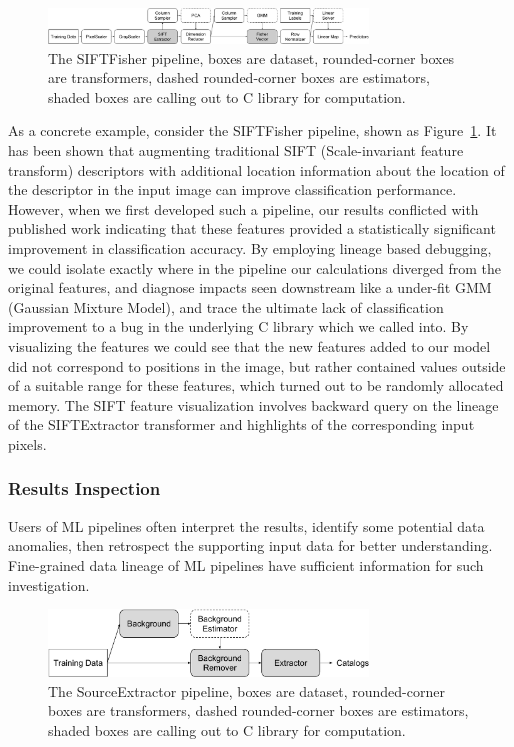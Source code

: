 \documentclass{sig-alternate}
\begin{document}
\begin{figure}[ht]
\begin{center}
    \includegraphics[width=85mm]{pictures/VOCSIFTFisher}
    \caption {The SIFTFisher pipeline, boxes are dataset, rounded-corner boxes are transformers, dashed rounded-corner boxes are estimators, shaded boxes are calling out to C library for computation.
    \label{fig:vocsiftfisher}
}
\end{center}
\end{figure}

As a concrete example, consider the SIFTFisher pipeline, shown as Figure~\ref{fig:vocsiftfisher}. 
It has been shown that augmenting traditional SIFT (Scale-invariant feature transform) descriptors with additional location information about the location of the descriptor in the input image can improve classification performance.
However, when we first developed such a pipeline, our results conflicted with published work indicating that these features provided a statistically significant improvement in classification accuracy.
By employing lineage based debugging, we could isolate exactly where in the pipeline our calculations diverged from the original features, and diagnose impacts seen downstream like a under-fit GMM (Gaussian Mixture Model), and trace the ultimate lack of classification improvement to a bug in the underlying C library which we called into.
By visualizing the features we could see that the new features added to our model did not correspond to positions in the image, but rather contained values outside of a suitable range for these features, which turned out to be randomly allocated memory. The SIFT feature visualization involves backward query on the lineage of the SIFTExtractor transformer and highlights of the corresponding input pixels.


\subsubsection{Results Inspection}
Users of ML pipelines often interpret the results, identify some potential data anomalies, then retrospect the supporting input data for better understanding.
Fine-grained data lineage of ML pipelines have sufficient information for such investigation.

\begin{figure}[h]
\begin{center}
    \includegraphics[width=85mm]{pictures/SourceExtractor}
    \caption {The SourceExtractor pipeline, boxes are dataset, rounded-corner boxes are transformers, dashed rounded-corner boxes are estimators, shaded boxes are calling out to C library for computation.
    \label{fig:sourceextractor}
}
\end{center}
\end{figure}
\end{document}
